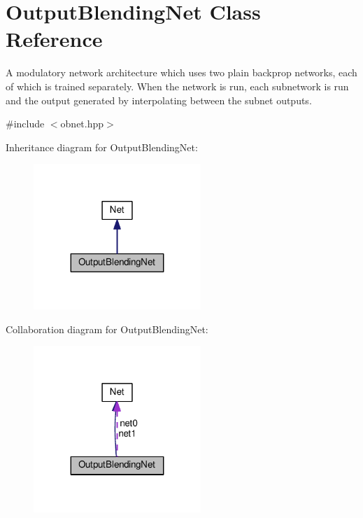 \hypertarget{classOutputBlendingNet}{}\section{Output\+Blending\+Net Class Reference}
\label{classOutputBlendingNet}


A modulatory network architecture which uses two plain backprop networks, each of which is trained separately. When the network is run, each subnetwork is run and the output generated by interpolating between the subnet outputs.  




{\ttfamily \#include $<$obnet.\+hpp$>$}



Inheritance diagram for Output\+Blending\+Net\+:
\nopagebreak
\begin{figure}[H]
\begin{center}
\leavevmode
\includegraphics[width=179pt]{classOutputBlendingNet__inherit__graph}
\end{center}
\end{figure}


Collaboration diagram for Output\+Blending\+Net\+:
\nopagebreak
\begin{figure}[H]
\begin{center}
\leavevmode
\includegraphics[width=179pt]{classOutputBlendingNet__coll__graph}
\end{center}
\end{figure}
